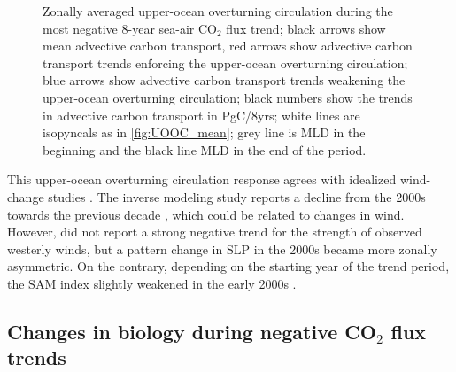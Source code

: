 \begin{figure}[hbt]
	\centering
	\captionsetup[subfigure]{labelformat=empty,justification=centering}
	\caption{Zonally averaged upper-ocean overturning circulation during the most negative 8-year sea-air CO$_2$ flux trend; black arrows show mean advective carbon transport, red arrows show advective carbon transport trends enforcing the upper-ocean overturning circulation; blue arrows show advective carbon transport trends weakening the upper-ocean overturning circulation; black numbers show the trends in advective carbon transport in PgC/8yrs; white lines are isopyncals as in \autoref{fig:UOOC_mean}; grey line is \ac{MLD} in the beginning and the black line MLD in the end of the period.}%
	\label{fig:UOOC_neg}
\end{figure}


This upper-ocean overturning circulation response agrees with idealized wind-change studies \citep{Lauderdale2013}. The inverse modeling study reports a decline from the 2000s towards the previous decade \citep{DeVries2017}, which could be related to changes in wind. However, \cite{landschuetzer2015} did not report a strong negative trend for the strength of observed westerly winds, but a pattern change in \acs{SLP} in the 2000s became more zonally asymmetric. On the contrary, depending on the starting year of the trend period, the \acs{SAM} index slightly weakened in the early 2000s \citep{Marshall2003,Lovenduski2015}.


\clearpage

\subsection{Changes in biology during negative CO$_2$ flux trends}
\label{sec:trends_neg_biology}

  

